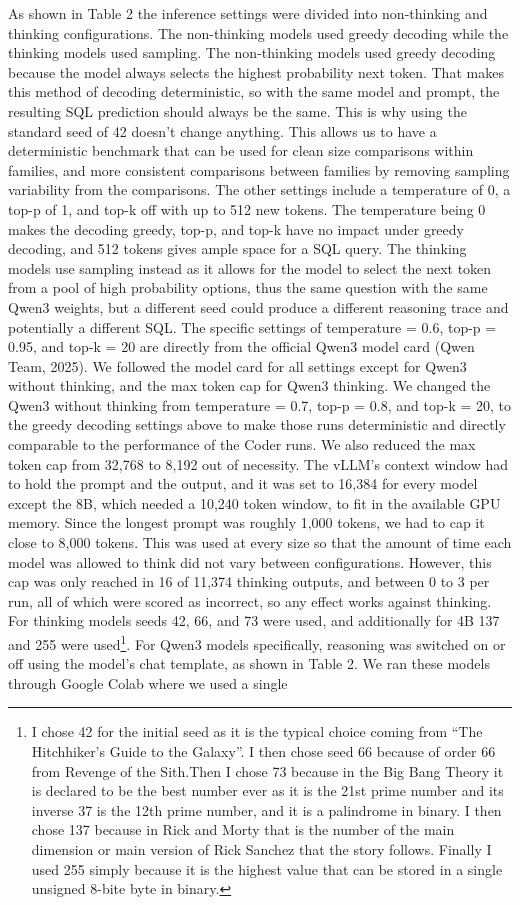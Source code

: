 As shown in Table 2 the inference settings were divided into non-thinking and thinking configurations. The non-thinking models used greedy decoding while the thinking models used sampling. The non-thinking models used greedy decoding because the model always selects the highest probability next token. That makes this method of decoding deterministic, so with the same model and prompt, the resulting SQL prediction should always be the same. This is why using the standard seed of 42 doesn't change anything. This allows us to have a deterministic benchmark that can be used for clean size comparisons within families, and more consistent comparisons between families by removing sampling variability from the comparisons. The other settings include a temperature of 0, a top-p of 1, and top-k off with up to 512 new tokens. The temperature being 0 makes the decoding greedy, top-p, and top-k have no impact under greedy decoding, and 512 tokens gives ample space for a SQL query. The thinking models use sampling instead as it allows for the model to select the next token from a pool of high probability options, thus the same question with the same Qwen3 weights, but a different seed could produce a different reasoning trace and potentially a different SQL. The specific settings of temperature = 0.6, top-p = 0.95, and top-k = 20 are directly from the official Qwen3 model card (Qwen Team, 2025). We followed the model card for all settings except for Qwen3 without thinking, and the max token cap for Qwen3 thinking. We changed the Qwen3 without thinking from temperature = 0.7, top-p = 0.8, and top-k = 20, to the greedy decoding settings above to make those runs deterministic and directly comparable to the performance of the Coder runs. We also reduced the max token cap from 32,768 to 8,192 out of necessity. The vLLM's context window had to hold the prompt and the output, and it was set to 16,384 for every model except the 8B, which needed a 10,240 token window, to fit in the available GPU memory. Since the longest prompt was roughly 1,000 tokens, we had to cap it close to 8,000 tokens. This was used at every size so that the amount of time each model was allowed to think did not vary between configurations. However, this cap was only reached in 16 of 11,374 thinking outputs, and between 0 to 3 per run, all of which were scored as incorrect, so any effect works against thinking. For thinking models seeds 42, 66, and 73 were used, and additionally for 4B 137 and 255 were used\footnote{I chose 42 for the initial seed as it is the typical choice coming from ``The Hitchhiker's Guide to the Galaxy''. I then chose seed 66 because of order 66 from Revenge of the Sith.Then I chose 73 because in the Big Bang Theory it is declared to be the best number ever as it is the 21st prime number and its inverse 37 is the 12th prime number, and it is a palindrome in binary. I then chose 137 because in Rick and Morty that is the number of the main dimension or main version of Rick Sanchez that the story follows. Finally I used 255 simply because it is the highest value that can be stored in a single unsigned 8-bite byte in binary.}. For Qwen3 models specifically, reasoning was switched on or off using the model's chat template, as shown in Table 2. We ran these models through Google Colab where we used a single 